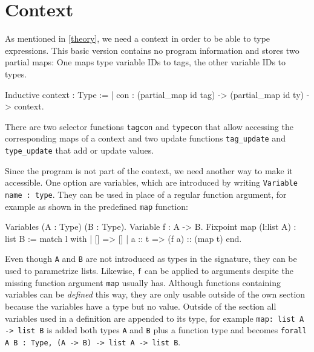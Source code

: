 \documentclass[paper = a4, fleqn, abstract=on, twoside]{scrreprt}
\newcommand{\coqinline}[1]{\texttt{#1}}
\begin{document}
\section{Context}
As mentioned in \autoref{theory}, we need a context in order to be able to type expressions. This basic version contains no program information and stores two partial maps: One maps type variable IDs to tags, the other variable IDs to types. 
\begin{coqcode}
Inductive context : Type := 
| con : (partial_map id tag) -> (partial_map id ty) -> context.
\end{coqcode}
There are two selector functions \coqinline{tagcon} and \coqinline{typecon} that allow accessing the corresponding maps of a context and two update functions \coqinline{tag_update} and \coqinline{type_update} that add or update values.
\par
Since the program is not part of the context, we need another way to make it accessible. One option are variables, which are introduced by writing \coqinline{Variable name : type}. They can be used in place of a regular function argument, for example as shown in the predefined \coqinline{map} function:
\begin{coqcode}
Variables (A : Type) (B : Type).
Variable f : A -> B.
Fixpoint map (l:list A) : list B :=
  match l with
  | [] => []
  | a :: t => (f a) :: (map t)
  end.
\end{coqcode}
Even though \coqinline{A} and \coqinline{B} are not introduced as types in the signature, they can be used to parametrize lists. Likewise, \coqinline{f} can be applied to arguments despite the missing function argument \coqinline{map} usually has. Although functions containing variables can be \textit{defined} this way, they are only usable outside of the own section because the variables have a type but no value. Outside of the section all variables used in a definition are appended to its type, for example \coqinline{map: list A -> list B} is added both types \texttt{A} and \texttt{B} plus a function type and becomes \coqinline{forall A B : Type, (A -> B) -> list A -> list B}.
\end{document}
